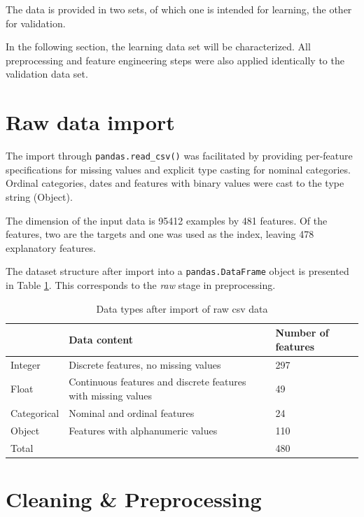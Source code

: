 \documentclass[
  11pt,
  a4paper,
  DIV=12,captions=tableheading,oneside]{scrbook}
\begin{document}
The data is provided in two sets, of which one is intended for learning, the other for validation.

In the following section, the learning data set will be characterized. All preprocessing and feature engineering steps were also applied identically to the validation data set.

\hypertarget{raw-data-import}{%
\section{Raw data import}\label{raw-data-import}}

The import through \texttt{pandas.read\_csv()} was facilitated by providing per-feature specifications for missing values and explicit type casting for nominal categories. Ordinal categories, dates and features with binary values were cast to the type string (Object).

The dimension of the input data is 95412 examples by 481 features. Of the features, two are the targets and one was used as the index, leaving 478 explanatory features.

The dataset structure after import into a \texttt{pandas.DataFrame} object is presented in Table \ref{tab:data-desc}.
This corresponds to the \emph{raw} stage in preprocessing.

\begin{table}[!h]

\caption{\label{tab:data-desc}Data types after import of raw csv data}
\centering
\begin{tabular}{l>{\raggedright\arraybackslash}p{6cm}l}
\toprule
  & Data content & Number of features\\
\midrule
Integer & Discrete features, no missing values & 297\\
Float & Continuous features and discrete features with missing values & 49\\
Categorical & Nominal and ordinal features & 24\\
Object & Features with alphanumeric values & 110\\
Total &  & 480\\
\bottomrule
\end{tabular}
\end{table}

\hypertarget{cleaning-preprocessing}{%
\section{Cleaning \& Preprocessing}\label{cleaning-preprocessing}}
\end{document}
